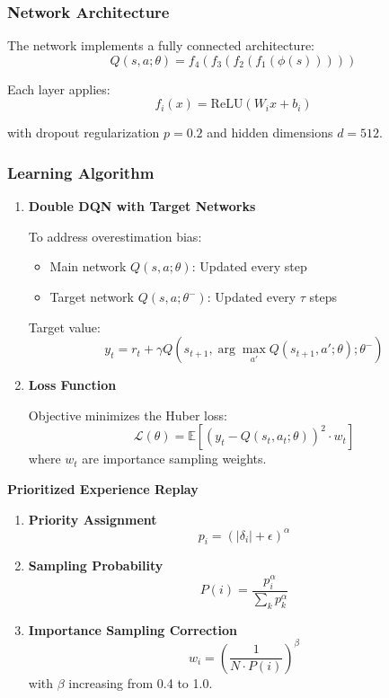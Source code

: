 \documentclass{article}
\begin{document}
\subsubsection{Network Architecture}

The network implements a fully connected architecture:
\[ Q(s,a;\theta) = f_4(f_3(f_2(f_1(\phi(s))))) \]

Each layer applies:
\[ f_i(x) = \text{ReLU}(W_i x + b_i) \]

with dropout regularization $p=0.2$ and hidden dimensions $d=512$.

\subsubsection{Learning Algorithm}
\begin{enumerate}
    \item \textbf{Double DQN with Target Networks}

To address overestimation bias:
\begin{itemize}
  \item Main network $Q(s,a;\theta)$: Updated every step
  \item Target network $Q(s,a;\theta^-)$: Updated every $\tau$ steps
\end{itemize}

Target value:
\[ y_t = r_t + \gamma Q(s_{t+1}, \arg\max_{a'} Q(s_{t+1},a';\theta); \theta^-) \]

    \item \textbf{Loss Function}

Objective minimizes the Huber loss:
\[ \mathcal{L}(\theta) = \mathbb{E}[(y_t - Q(s_t,a_t;\theta))^2 \cdot w_t] \]
where $w_t$ are importance sampling weights.

\end{enumerate}


\textbf{Prioritized Experience Replay}
\begin{enumerate}
    \item \textbf{Priority Assignment}
            \[ p_i = (|\delta_i| + \epsilon)^\alpha \]

    \item \textbf{Sampling Probability}
\[ P(i) = \frac{p_i^\alpha}{\sum_k p_k^\alpha} \]

   \item \textbf{Importance Sampling Correction}
\[ w_i = \left(\frac{1}{N \cdot P(i)}\right)^\beta \]
with $\beta$ increasing from 0.4 to 1.0.
\end{enumerate}
\end{document}
